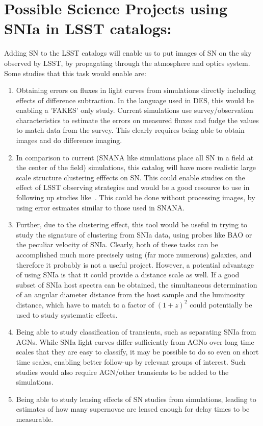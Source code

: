 \documentclass{article}[12pt]
\begin{document}
\section{Possible Science Projects using SNIa in LSST catalogs:} 
Adding SN to the LSST catalogs will enable us to put images of SN 
on the sky observed by LSST, by propagating through the atmosphere and optics 
system. Some studies that this task would enable are:
\begin{enumerate}
\item Obtaining errors on fluxes in light curves from simulations directly 
including effects of difference subtraction. In the language used in DES, this
would be enabling a 'FAKES' only study. Current simulations use survey/observation  characteristics to estimate the errors on measured fluxes and fudge the values to match data from the survey. This clearly requires being able to obtain 
images and do difference imaging.
\item In comparison to current (SNANA like simulations place all SN in a field 
at the center of the field) simulations, this catalog will have more realistic 
large scale structure clustering efffects on SN. This could enable 
studies on the effect of LSST observing strategies and would be a good resource
to use in following up studies like~\cite{Carroll:2014oja}. This could be 
done without processing images, by using error estmates similar to those used in
 SNANA.
\item Further, due to the clustering effect, this tool would be useful in 
trying to study the signature of clustering from SNIa data, using probes
like BAO or the peculiar velocity of SNIa. Clearly, both of these tasks can 
be accomplished much more precisely using (far more numerous) galaxies, and 
therefore it probably is not a useful project. However, a potential advantage 
of using SNIa is that it could provide a distance scale as well. If a good
subset of SNIa host spectra can be obtained, the simultaneous determination of an angular diameter distance from the host sample and the luminosity distance,
 which have to match to a factor of $(1 + z)^2$ could potentially be used to 
study systematic effects.  
\item Being able to study classification of transients, such as separating 
SNIa from AGNs. While SNIa light curves differ sufficiently from AGNo over
long time scales that they are easy to classify, it may be possible to do so 
even on short time scales, enabling better follow-up by relevant groups of interest. Such studies would also require AGN/other transients to be added to the 
simulations.   
\item Being able to study lensing effects of SN studies from simulations,
leading to estimates of how many supernovae are lensed enough for delay times to
be measurable.
\end{enumerate}
\end{document}
